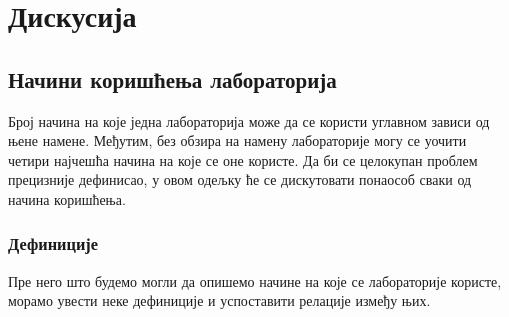 \documentclass[a4paper, 12pt, diplomski]{etfcyr}
\begin{document}
	\chapter{Дискусија}
		
		\section{Начини коришћења лабораторија}
		
		\begin{justify}
			Број начина на које једна лабораторија може да се користи углавном зависи од њене намене. Међутим, без обзира на намену лабораторије могу се уочити четири најчешћа начина на које се оне користе. Да би се целокупан проблем прецизније дефинисао, у овом одељку ће се дискутовати понаособ сваки од начина коришћења.
		\end{justify}
		
		\subsection{Дефиниције}
		
		\begin{justify}
			Пре него што будемо могли да опишемо начине на које се лабораторије користе, морамо увести неке дефиниције и успоставити релације између њих.
		\end{justify}
\end{document}
